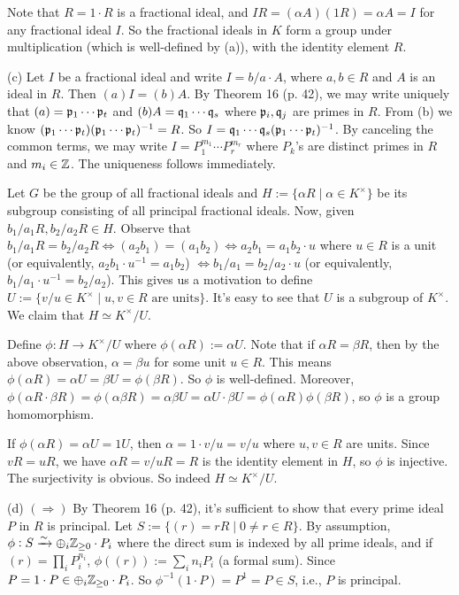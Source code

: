 \documentclass[../Marcus.tex]{subfiles}
\begin{document}
Note that $R=1\cdot R$ is a fractional ideal, and $IR=(\alpha A)(1R)=\alpha A=I$ for any fractional ideal $I$. So the fractional ideals in $K$ form a group under multiplication (which is well-defined by (a)), with the identity element $R$.

(c) Let $I$ be a fractional ideal and write $I=b/a\cdot A$, where $a,b\in R$ and $A$ is an ideal in $R$. Then $(a)I=(b)A$. By Theorem 16 (p. 42), we may write uniquely that $(a)=\mathfrak{p}_1\cdots\mathfrak{p}_t$ and $(b)A=\mathfrak{q}_1\cdots\mathfrak{q}_s$ where $\mathfrak{p}_i,\mathfrak{q}_j$ are primes in $R$. From (b) we know $(\mathfrak{p}_1\cdots\mathfrak{p}_t)(\mathfrak{p}_1\cdots\mathfrak{p}_t)^{-1}=R$. So $I=\mathfrak{q}_1\cdots\mathfrak{q}_s(\mathfrak{p}_1\cdots\mathfrak{p}_t)^{-1}$. By canceling the common terms, we may write $I=P_1^{m_1}\cdots P_r^{m_r}$ where $P_k$'s are distinct primes in $R$ and $m_i\in\mathbb{Z}$. The uniqueness follows immediately.

Let $G$ be the group of all fractional ideals and $H:=\{\alpha R\mid \alpha\in K^\times\}$ be its subgroup consisting of all principal fractional ideals. Now, given $b_1/a_1R, b_2/a_2R\in H$. Observe that $b_1/a_1R=b_2/a_2R \iff (a_2b_1)=(a_1b_2) \iff a_2b_1=a_1b_2\cdot u$ where $u\in R$ is a unit (or equivalently, $a_2b_1\cdot u^{-1}=a_1b_2$) $\iff b_1/a_1=b_2/a_2\cdot u$ (or equivalently, $b_1/a_1\cdot u^{-1}=b_2/a_2$). This gives us a motivation to define $U:=\{v/u\in K^\times\mid u,v\in R\text{ are units}\}$. It's easy to see that $U$ is a subgroup of $K^\times$. We claim that $H\simeq K^\times/U$.

Define $\phi:H\to K^\times/U$ where $\phi(\alpha R):=\alpha U$. Note that if $\alpha R=\beta R$, then by the above observation, $\alpha=\beta u$ for some unit $u\in R$. This means $\phi(\alpha R)=\alpha U=\beta U=\phi(\beta R)$. So $\phi$ is well-defined. Moreover, $\phi(\alpha R\cdot \beta R)=\phi(\alpha\beta R)=\alpha\beta U=\alpha U\cdot \beta U=\phi(\alpha R)\phi(\beta R)$, so $\phi$ is a group homomorphism.

If $\phi(\alpha R)=\alpha U=1U$, then $\alpha=1\cdot v/u=v/u$ where $u,v\in R$ are units. Since $vR=uR$, we have $\alpha R=v/u R = R$ is the identity element in $H$, so $\phi$ is injective. The surjectivity is obvious. So indeed $H\simeq K^\times/U$.

(d) $(\Rightarrow)$ By Theorem 16 (p. 42), it's sufficient to show that every prime ideal $P$ in $R$ is principal. Let $S:=\{(r)=rR\mid 0\neq r\in R\}$. By assumption, $\phi:S\xrightarrow{\sim} \oplus_i \mathbb{Z}_{\geq0} \cdot P_i$ where the direct sum is indexed by all prime ideals, and if $(r)=\prod_i P_i^{n_i}$, $\phi((r)):=\sum_i n_iP_i$ (a formal sum). Since $P=1\cdot P\in \oplus_{i} \mathbb{Z}_{\geq0} \cdot P_i$. So $\phi^{-1}(1\cdot P)=P^1=P\in S$, i.e., $P$ is principal.
\end{document}
